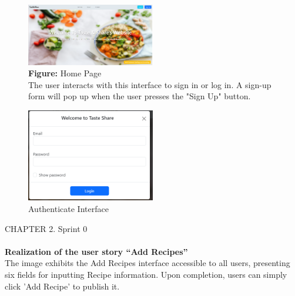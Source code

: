 \documentclass{article}
\begin{document}
{{{\begin{figure}[htbp]
    \centering
    \includegraphics[width=0.5\textwidth]{wlcm} 
    \vspace{0.5cm}\\
    \textbf{Figure:} Home Page \\
    The user interacts with this interface to sign in or log in. A sign-up form will pop up when the user presses the "Sign Up" button.
\end{figure}

\begin{figure}[htbp]
    \centering
    \includegraphics[width=0.5\textwidth]{logtaste}
    \caption{Authenticate Interface}
    \label{fig:design2}
\end{figure}
\newpage
\noindent
CHAPTER 2.  Sprint 0 \\
\underline{\hspace{\textwidth}} \vspace{0.2cm}\\

\textbf{Realization of the user story “Add Recipes”}\\
The image exhibits the Add Recipes interface accessible to all users, presenting six fields for inputting Recipe information. Upon completion, users can simply click 'Add Recipe' to publish it.\\

}}}
\end{document}
